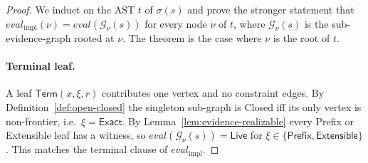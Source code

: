\begin{proof}
	We induct on the AST $t$ of $\sigma(s)$ and prove the stronger statement that $\mathit{eval}_{\mathrm{impl}}(\nu) = \mathit{eval}(\mathcal G_\nu(s))$ for every node $\nu$ of $t$, where $\mathcal G_\nu(s)$ is the sub-evidence-graph rooted at $\nu$. The theorem is the case where $\nu$ is the root of $t$.

	\paragraph{Terminal leaf.} A leaf $\mathsf{Term}(x,\xi,r)$ contributes one vertex and no constraint edges. By Definition~\ref{def:open-closed} the singleton sub-graph is Closed iff its only vertex is non-frontier, i.e.\ $\xi = \mathsf{Exact}$. By Lemma~\ref{lem:evidence-realizable} every Prefix or Extensible leaf has a witness, so $\mathit{eval}(\mathcal G_\nu(s)) = \mathsf{Live}$ for $\xi \in \{\mathsf{Prefix},\mathsf{Extensible}\}$. This matches the terminal clause of $\mathit{eval}_{\mathrm{impl}}$.


\end{proof}
